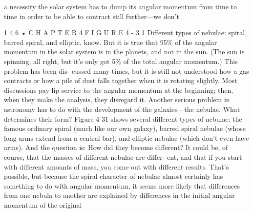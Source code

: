 \documentclass[10pt,oneside]{article}
\begin{document}
a necessity the solar system has to dump its angular momentum from time to time in order to be able to contract still further---we don’t\par

1 4 6 • C H A P T E R  4 F I G U R E  4 - 3 1 Different types of nebulae: spiral, barred spiral, and elliptic. know. But it is true that 95\% of the angular momentum in the solar system is in the planets, and not in the sun. (The sun is spinning, all right, but it’s only got 5\% of the total angular momentum.) This problem has been dis- cussed many times, but it is still not understood how a gas contracts or how a pile of dust falls together when it is rotating slightly. Most discussions pay lip service to the angular momentum at the beginning; then, when they make the analysis, they disregard it. Another serious problem in astronomy has to do with the development of the galaxies---the nebulae. What determines their form? Figure 4-31 shows several different types of nebulae: the famous ordinary spiral (much like our own galaxy), barred spiral nebulae (whose long arms extend from a central bar), and elliptic nebulae (which don’t even have arms). And the question is: How did they become different? It could be, of course, that the masses of different nebulae are differ- ent, and that if you start with different amounts of mass, you come out with different results. That’s possible, but because the spiral character of nebulae almost certainly has something to do with angular momentum, it seems more likely that differences from one nebula to another are explained by differences in the initial angular momentum of the original\par
\end{document}
